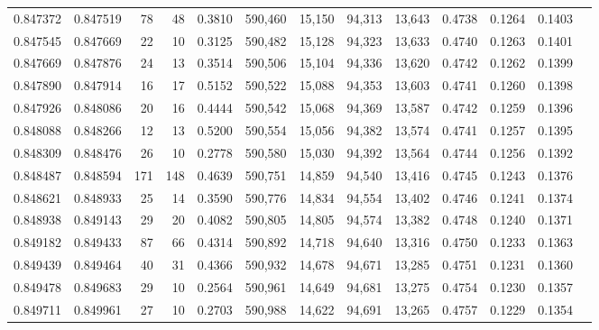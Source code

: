 \begin{tabular}{rrrrrrrrrrrrr}
0.847372 & 0.847519 &    78 &  48 &                                     0.3810 & 590,460 &  15,150 &  94,313 &  13,643 & 0.4738 & 0.1264 & 0.1403 \\
0.847545 & 0.847669 &    22 &  10 &                                     0.3125 & 590,482 &  15,128 &  94,323 &  13,633 & 0.4740 & 0.1263 & 0.1401 \\
0.847669 & 0.847876 &    24 &  13 &                                     0.3514 & 590,506 &  15,104 &  94,336 &  13,620 & 0.4742 & 0.1262 & 0.1399 \\
0.847890 & 0.847914 &    16 &  17 &                                     0.5152 & 590,522 &  15,088 &  94,353 &  13,603 & 0.4741 & 0.1260 & 0.1398 \\
0.847926 & 0.848086 &    20 &  16 &                                     0.4444 & 590,542 &  15,068 &  94,369 &  13,587 & 0.4742 & 0.1259 & 0.1396 \\
0.848088 & 0.848266 &    12 &  13 &                                     0.5200 & 590,554 &  15,056 &  94,382 &  13,574 & 0.4741 & 0.1257 & 0.1395 \\
0.848309 & 0.848476 &    26 &  10 &                                     0.2778 & 590,580 &  15,030 &  94,392 &  13,564 & 0.4744 & 0.1256 & 0.1392 \\
0.848487 & 0.848594 &   171 & 148 &                                     0.4639 & 590,751 &  14,859 &  94,540 &  13,416 & 0.4745 & 0.1243 & 0.1376 \\
0.848621 & 0.848933 &    25 &  14 &                                     0.3590 & 590,776 &  14,834 &  94,554 &  13,402 & 0.4746 & 0.1241 & 0.1374 \\
0.848938 & 0.849143 &    29 &  20 &                                     0.4082 & 590,805 &  14,805 &  94,574 &  13,382 & 0.4748 & 0.1240 & 0.1371 \\
0.849182 & 0.849433 &    87 &  66 &                                     0.4314 & 590,892 &  14,718 &  94,640 &  13,316 & 0.4750 & 0.1233 & 0.1363 \\
0.849439 & 0.849464 &    40 &  31 &                                     0.4366 & 590,932 &  14,678 &  94,671 &  13,285 & 0.4751 & 0.1231 & 0.1360 \\
0.849478 & 0.849683 &    29 &  10 &                                     0.2564 & 590,961 &  14,649 &  94,681 &  13,275 & 0.4754 & 0.1230 & 0.1357 \\
0.849711 & 0.849961 &    27 &  10 &                                     0.2703 & 590,988 &  14,622 &  94,691 &  13,265 & 0.4757 & 0.1229 & 0.1354 \\

\end{tabular}

